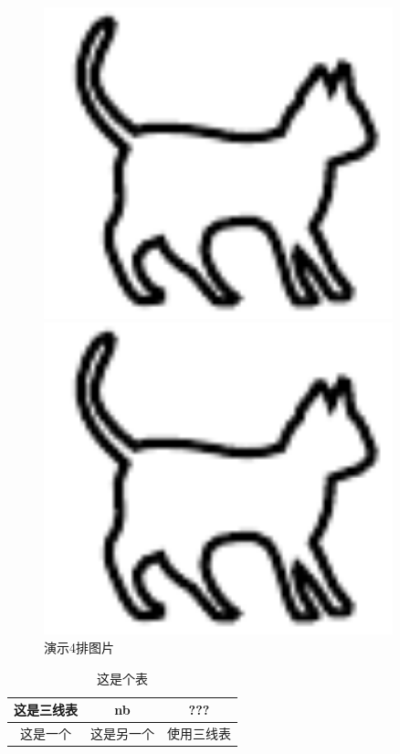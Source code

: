 \documentclass{cumcmthesis} %
\begin{document}
\begin{figure}[H]
\begin{minipage}[t]{0.5\textwidth}
        \centering
        \includegraphics[width=0.9\textwidth]{img/cat.pdf}
    \end{minipage}
    \begin{minipage}[t]{0.5\textwidth}
        \centering
        \includegraphics[width=0.9\textwidth]{img/cat.pdf}
    \end{minipage}
    \caption{演示4排图片}
\end{figure}


\begin{table}[H]
    \centering
    \setlength{\belowcaptionskip}{3pt} %
    \renewcommand\arraystretch{1} %
    \setlength{\tabcolsep}{10mm} %
    \caption{这是个表}
    \label{}
    \begin{tabular}{ccc}
        \toprule[1.5pt]
        这是三线表 & nb         & ???        \\
        \midrule
        这是一个   & 这是另一个 & 使用三线表 \\
        \bottomrule[1.5pt]
    \end{tabular}
\end{table}
\end{document}
